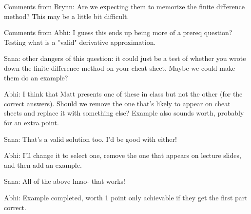 \begin{parts}
\begin{subparts}
\begin{qauthor}
    Comments from Brynn: Are we expecting them to memorize the finite difference method? This may be a little bit difficult. 
    
    Comments from Abhi: I guess this ends up being more of a prereq question? Testing what is a "valid" derivative approximation.
    
    Sana: other dangers of this question: it could just be a test of whether you wrote down the finite difference method on your cheat sheet. Maybe we could make them do an example?
    
    Abhi: I think that Matt presents one of these in class but not the other (for the correct answers). Should we remove the one that's likely to appear on cheat sheets and replace it with something else? Example also sounds worth, probably for an extra point.
    
    Sana: That's a valid solution too. I'd be good with either!
    
    Abhi: I'll change it to select one, remove the one that appears on lecture slides, and then add an example.
    
    Sana: All of the above lmao- that works!
    
    Abhi: Example completed, worth 1 point only achievable if they get the first part correct.
    \end{qauthor}
    
\end{subparts}




\end{parts}
